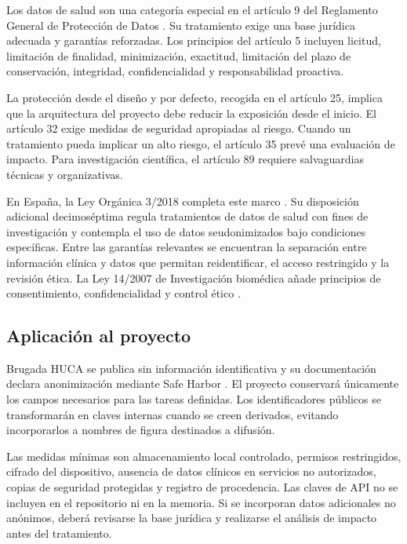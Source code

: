 Los datos de salud son una categoría especial en el artículo 9 del Reglamento General de Protección de Datos \cite{gdpr}. Su tratamiento exige una base jurídica adecuada y garantías reforzadas. Los principios del artículo 5 incluyen licitud, limitación de finalidad, minimización, exactitud, limitación del plazo de conservación, integridad, confidencialidad y responsabilidad proactiva.

La protección desde el diseño y por defecto, recogida en el artículo 25, implica que la arquitectura del proyecto debe reducir la exposición desde el inicio. El artículo 32 exige medidas de seguridad apropiadas al riesgo. Cuando un tratamiento pueda implicar un alto riesgo, el artículo 35 prevé una evaluación de impacto. Para investigación científica, el artículo 89 requiere salvaguardias técnicas y organizativas.

En España, la Ley Orgánica 3/2018 completa este marco \cite{lopdgdd}. Su disposición adicional decimoséptima regula tratamientos de datos de salud con fines de investigación y contempla el uso de datos seudonimizados bajo condiciones específicas. Entre las garantías relevantes se encuentran la separación entre información clínica y datos que permitan reidentificar, el acceso restringido y la revisión ética. La Ley 14/2007 de Investigación biomédica añade principios de consentimiento, confidencialidad y control ético \cite{ley142007}.

\subsection{Aplicación al proyecto}

Brugada HUCA se publica sin información identificativa y su documentación declara anonimización mediante Safe Harbor \cite{costacortez2026brugada}. El proyecto conservará únicamente los campos necesarios para las tareas definidas. Los identificadores públicos se transformarán en claves internas cuando se creen derivados, evitando incorporarlos a nombres de figura destinados a difusión.

Las medidas mínimas son almacenamiento local controlado, permisos restringidos, cifrado del dispositivo, ausencia de datos clínicos en servicios no autorizados, copias de seguridad protegidas y registro de procedencia. Las claves de API no se incluyen en el repositorio ni en la memoria. Si se incorporan datos adicionales no anónimos, deberá revisarse la base jurídica y realizarse el análisis de impacto antes del tratamiento.

